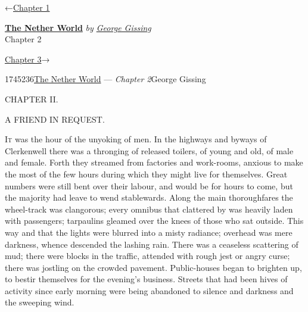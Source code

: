 \hypertarget{headerContainer}{}
\hypertarget{navigationHeader}{}
\protect\hypertarget{headerprevious}{}{←\href{/wiki/The_Nether_World/Volume_1/Chapter_1}{Chapter
1}}

\textbf{\protect\hypertarget{header_title_text}{}{\href{/wiki/The_Nether_World}{The
Nether World}}} \emph{by
\href{/wiki/Author:George_Gissing}{\protect\hypertarget{header_author_text}{}{{George
Gissing}}}}\\
\protect\hypertarget{header_section_text}{}{Chapter 2}

\protect\hypertarget{headernext}{}{\href{/wiki/The_Nether_World/Volume_1/Chapter_3}{Chapter
3}→}

\hypertarget{navigationNotes}{}

\hypertarget{ws-data}{}
\protect\hypertarget{ws-article-id}{}{1745236}\protect\hypertarget{ws-title}{}{\href{/wiki/The_Nether_World}{The
Nether World} --- \emph{Chapter
2}}\protect\hypertarget{ws-author}{}{George Gissing}

{\protect\hypertarget{23}{}{}}

{CHAPTER II.}

A FRIEND IN REQUEST.

\textsc{It} was the hour of the unyoking of men. In the highways and
byways of Clerkenwell there was a thronging of released toilers, of
young and old, of male and female. Forth they streamed from factories
and work-rooms, anxious to make the most of the few hours during which
they might live for themselves. Great numbers were still bent over their
labour, and would be for hours to come, but the majority had leave to
wend stablewards. Along the main thoroughfares the wheel-track was
clangorous; every omnibus that clattered by was heavily laden with
passengers; tarpaulins gleamed over the knees of those who sat outside.
This way and that the lights were blurred into a misty radiance;
overhead was mere {\protect\hypertarget{24}{}{}}darkness, whence
descended the lashing rain. There was a ceaseless scattering of mud;
there were blocks in the traffic, attended with rough jest or angry
curse; there was jostling on the crowded pavement. Public-houses began
to brighten up, to bestir themselves for the evening's business. Streets
that had been hives of activity since early morning were being abandoned
to silence and darkness and the sweeping wind.

